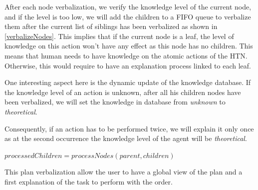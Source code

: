 \documentclass{llncs}
\begin{document}
After each node verbalization, we verify the knowledge level of the current node, and if the level is too low, we will add the children
to a FIFO queue to verbalize them after the current list of siblings has been verbalized as shown in \ref{verbalizeNodes}.
This implies that if the current node is a leaf, the level of knowledge on this action won't have any effect as this node has no children. This means that human needs to have knowledge on the atomic actions of the HTN. Otherwise, this would require to have an explanation process linked to each leaf.

One interesting aspect here is the dynamic update of the knowledge database.
If the knowledge level of an action is unknown, after all his children nodes have been verbalized, we will set the knowledge in database from \textit{unknown} to \textit{theoretical}.

Consequently, if an action has to be performed twice, we will explain it only once as at the second occurrence the knowledge level of the agent will be \textit{theoretical}.

\begin{algorithm}[H]
$processedChildren = processNodes(parent, children)$\;

    \caption{$verbalize\_nodes$ \label{verbalizeNodes}}

\end{algorithm}

This plan verbalization allow the user to have a global view of the plan and a first explanation of the task to perform with the order.

\end{document}
